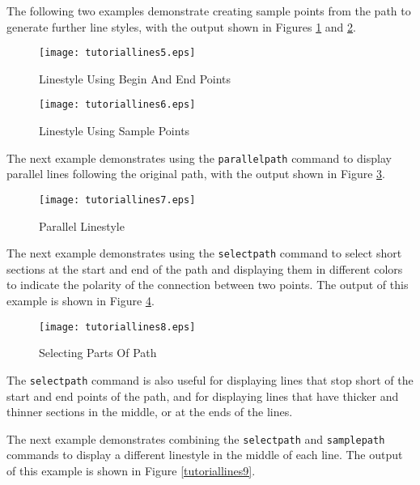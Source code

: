 The following two examples demonstrate creating sample points
from the path to generate further line styles,
with the output shown in Figures \ref{tutoriallines5}
and \ref{tutoriallines6}.



\begin{figure}[htb]
\texttt{[image: tutoriallines5.eps]}
\caption{Linestyle Using Begin And End Points}
\label{tutoriallines5}
\end{figure}



\begin{figure}[htb]
\texttt{[image: tutoriallines6.eps]}
\caption{Linestyle Using Sample Points}
\label{tutoriallines6}
\end{figure}

The next example demonstrates using the \texttt{parallelpath}
command to display parallel lines following the original path,
with the output shown in Figure \ref{tutoriallines7}.



\begin{figure}[htb]
\texttt{[image: tutoriallines7.eps]}
\caption{Parallel Linestyle}
\label{tutoriallines7}
\end{figure}

The next example demonstrates using the \texttt{selectpath}
command to select short sections at the start and end of
the path and displaying them in different colors to indicate
the polarity of the connection between two points.
The output of this example is shown in Figure \ref{tutoriallines8}.



\begin{figure}[htb]
\texttt{[image: tutoriallines8.eps]}
\caption{Selecting Parts Of Path}
\label{tutoriallines8}
\end{figure}

The \texttt{selectpath} command is also useful for displaying lines that stop
short of the start and end points of the path, and for displaying
lines that have thicker and thinner sections in the middle, or
at the ends of the lines.

The next example demonstrates combining the \texttt{selectpath}
and \texttt{samplepath} commands to display a different linestyle
in the middle of each line.
The output of this example is shown in Figure \ref{tutoriallines9}.

